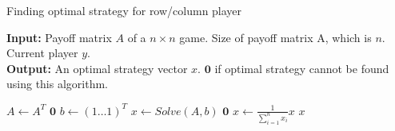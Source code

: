 \documentclass{article}
\begin{document}
\begin{algorithm}
\caption{Finding optimal strategy for row/column player}\label{alg:cap}

\hspace*{\algorithmicindent} \textbf{Input: }
{Payoff matrix $A$ of a $n \times n$ game. Size of payoff matrix A, which is $n$. Current player $y$.}\\
\hspace*{\algorithmicindent} \textbf{Output: }
{An optimal strategy vector $x$. $\mathbf{0}$ if optimal strategy cannot be found using this algorithm.}

\begin{algorithmic}
    \State $A \gets A^T$
\EndIf
{} 
    \State \Return $\mathbf{0}$
\EndIf
\State $b \gets (1 \ldots 1)^T$ 
\State $x \gets Solve(A, b)$ 
        \State \Return $\mathbf{0}$ 
    \EndIf
\EndFor
\State $x \gets \frac{1}{\sum_{i=1}^{n}x_i}x$ 
\State \Return $x$
\EndProcedure
\end{algorithmic}
\end{algorithm}
\end{document}
